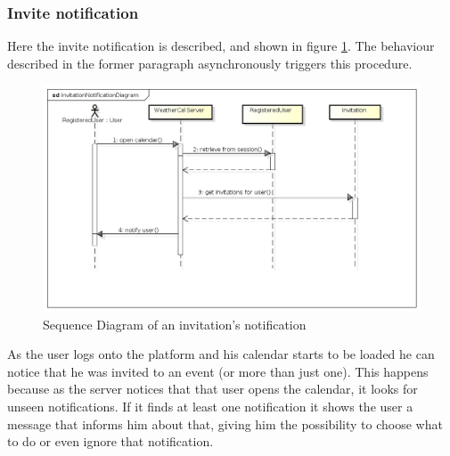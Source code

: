 \subsubsection{Invite notification}
Here the invite notification is described, and shown in figure \ref{fig:notseqdiagr}. The behaviour described in the former paragraph asynchronously triggers this procedure.
\begin{center}
 \begin{figure}[H]
    \includegraphics[width=1\textwidth,height=1\textwidth]{./UMLDiagram/sequence/InvitationNotificationDiagram/InvitationNotificationDiagram.png}
    \caption{Sequence Diagram of an invitation's notification}
     \label{fig:notseqdiagr}
     \end{figure}
   \end{center}  
As the user logs onto the platform and his calendar starts to be loaded he can notice that he was invited to an event (or more than just one). This happens because as the server notices that that user opens the calendar, it looks for unseen notifications. If it finds at least one notification it shows the user a message that informs him about that, giving him the possibility to choose what to do or even ignore that notification. 
